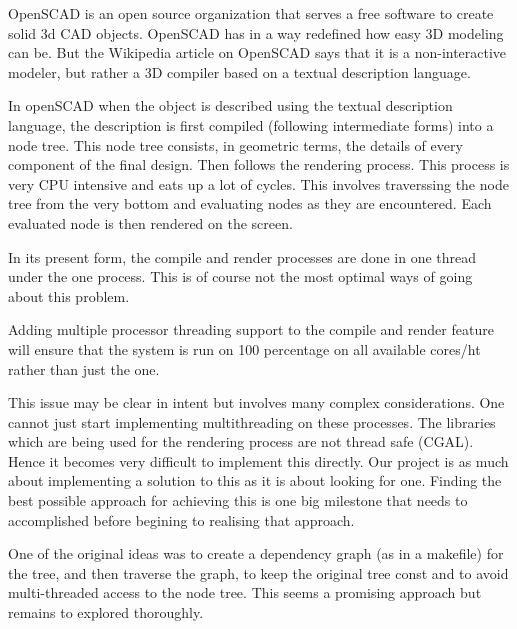 \begin{Large}
\end{Large}
OpenSCAD is an open source organization that serves a free software to create solid 3d CAD objects. OpenSCAD has in a way redefined how easy 3D modeling can be. But the Wikipedia article on OpenSCAD says that it is a non-interactive modeler, but rather a 3D compiler based on a textual description language.

In openSCAD when the object is described using the textual description language, the description is first compiled (following intermediate forms) into a node tree. This node tree consists, in geometric terms, the details of every component of the final design. Then follows the rendering process. This process is very CPU intensive and eats up a lot of cycles. This involves traverssing the node tree from the very bottom and evaluating nodes as they are encountered. Each evaluated node is then rendered on the screen.

In its present form, the compile and render processes are done in one thread under the one process. This is of course not the most optimal ways of going about this problem.

Adding multiple processor threading support to the compile and render feature will ensure that the system is run on 100 percentage on all available cores/ht rather than just the one.

This issue may be clear in intent but involves many complex considerations. One cannot just start implementing multithreading on these processes. The libraries which are being used for the rendering process are not thread safe (CGAL). Hence it becomes very difficult to implement this directly. Our project is as much about implementing a solution to this as it is about looking for one. Finding the best possible approach for achieving this is one big milestone that needs to accomplished before begining to realising that approach.

One of the original ideas was to create a dependency graph (as in a makefile) for the tree, and then traverse the graph, to keep the original tree const and to avoid multi-threaded access to the node tree. This seems a promising approach but remains to explored thoroughly.


